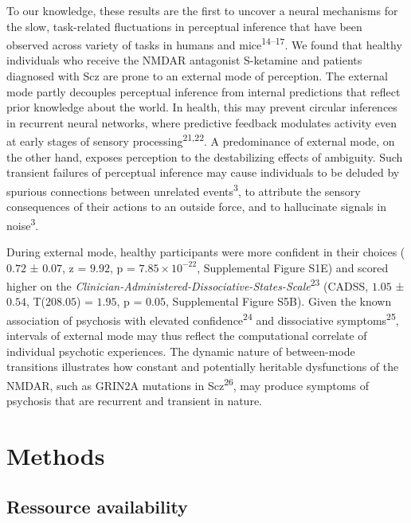 \documentclass[
]{article}
\begin{document}
To our knowledge, these results are the first to uncover a neural
mechanisms for the slow, task-related fluctuations in perceptual
inference that have been observed across variety of tasks in humans and
mice\textsuperscript{14--17}. We found that healthy individuals who
receive the NMDAR antagonist S-ketamine and patients diagnosed with Scz
are prone to an external mode of perception. The external mode partly
decouples perceptual inference from internal predictions that reflect
prior knowledge about the world. In health, this may prevent circular
inferences in recurrent neural networks, where predictive feedback
modulates activity even at early stages of sensory
processing\textsuperscript{21,22}. A predominance of external mode, on
the other hand, exposes perception to the destabilizing effects of
ambiguity. Such transient failures of perceptual inference may cause
individuals to be deluded by spurious connections between unrelated
events\textsuperscript{3}, to attribute the sensory consequences of
their actions to an outside force, and to hallucinate signals in
noise\textsuperscript{3}.

During external mode, healthy participants were more confident in their
choices (\(0.72\) ± \(0.07\), z = \(9.92\), p =
\(\ensuremath{7.85\times 10^{-22}}\), Supplemental Figure S1E) and
scored higher on the
\emph{Clinician-Administered-Dissociative-States-Scale}\textsuperscript{23}
(CADSS, \(1.05\) ± \(0.54\), T(\(208.05\)) = \(1.95\), p = \(0.05\),
Supplemental Figure S5B). Given the known association of psychosis with
elevated confidence\textsuperscript{24} and dissociative
symptoms\textsuperscript{25}, intervals of external mode may thus
reflect the computational correlate of individual psychotic experiences.
The dynamic nature of between-mode transitions illustrates how constant
and potentially heritable dysfunctions of the NMDAR, such as GRIN2A
mutations in Scz\textsuperscript{26}, may produce symptoms of psychosis
that are recurrent and transient in nature.

\newpage

\hypertarget{methods}{%
\section{Methods}\label{methods}}

\hypertarget{ressource-availability}{%
\subsection{Ressource availability}\label{ressource-availability}}
\end{document}
